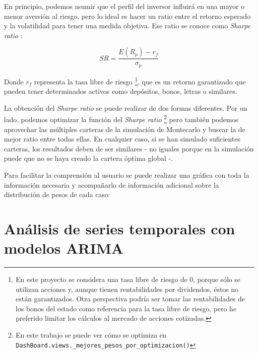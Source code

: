 En principio, podemos asumir que el perfil del inversor influirá en una mayor o menor aversión al riesgo, pero lo ideal es hacer un ratio entre el retorno esperado y la volatilidad para tener una medida objetiva. Ese ratio se conoce como \emph{Sharpe ratio} \citep{wiki:sharpe_ratio}:

\begin{equation}
	SR = \frac{E(R_{p}) - r_{f}}{\sigma_{p}}
\end{equation}

Donde $r_{f}$ representa la tasa libre de riesgo \footnote{En este proyecto se considera una tasa libre de riesgo de 0, porque sólo se utilizan acciones y, aunque tienen rentabilidades por dividendos, éstos no están garantizados. Otra perspectiva podría ser tomar las rentabilidades de los bonos del estado como referencia para la tasa libre de riesgo, pero he preferido limitar los cálculos al mercado de acciones cotizadas.}, que es un retorno garantizado que pueden tener determinados activos como depósitos, bonos, letras o similares. 

La obtención del \emph{Sharpe ratio} se puede realizar de dos formas diferentes. Por un lado, podemos optimizar la función del \emph{Sharpe ratio} \footnote{En este trabajo se puede ver cómo se optimiza en \texttt{DashBoard.views.\_mejores\_pesos\_por\_optimizacion()}} pero también podemos aprovechar las múltiples carteras de la simulación de Montecarlo y buscar la de mejor ratio entre todas ellas. En cualquier caso, si se han simulado suficientes carteras, los resultados deben de ser similares - no iguales porque en la simulación puede que no se haya creado la cartera óptima global -. 

Para facilitar la comprensión al usuario se puede realizar una gráfica con toda la información necesaria y acompañarlo de información adicional sobre la distribución de pesos de cada caso:




\section{Análisis de series temporales con modelos ARIMA}\label{series_temporales}


